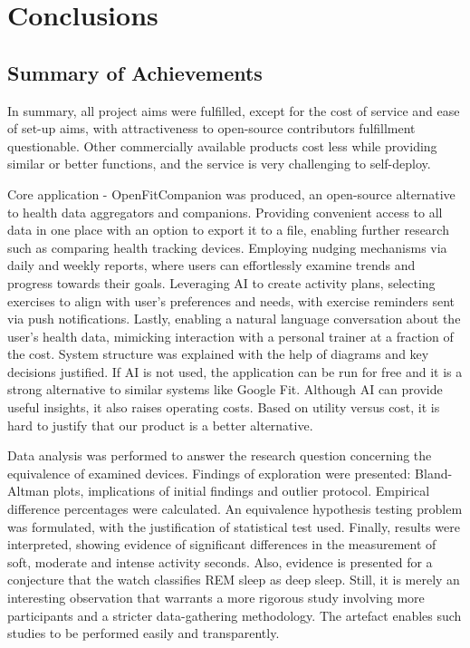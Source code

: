 \chapter{Conclusions}
\label{cha:evaluation}
\section{Summary of Achievements}
In summary, all project aims were fulfilled, except for the cost of service and ease of set-up aims, with attractiveness to open-source contributors fulfillment questionable. Other commercially available products cost less while providing similar or better functions, and the service is very challenging to self-deploy.

Core application - OpenFitCompanion was produced, an open-source alternative to health data aggregators and companions. Providing convenient access to all data in one place with an option to export it to a file, enabling further research such as comparing health tracking devices. Employing nudging mechanisms via daily and weekly reports, where users can effortlessly examine trends and progress towards their goals. Leveraging AI to create activity plans, selecting exercises to align with user's preferences and needs, with exercise reminders sent via push notifications. Lastly, enabling a natural language conversation about the user's health data, mimicking interaction with a personal trainer at a fraction of the cost. System structure was explained with the help of diagrams and key decisions justified. If AI is not used, the application can be run for free and it is a strong alternative to similar systems like Google Fit. Although AI can provide useful insights, it also raises operating costs. Based on utility versus cost, it is hard to justify that our product is a better alternative.

Data analysis was performed to answer the research question concerning the equivalence of examined devices. Findings of exploration were presented: Bland-Altman plots, implications of initial findings and outlier protocol. Empirical difference percentages were calculated. An equivalence hypothesis testing problem was formulated, with the justification of statistical test used. Finally, results were interpreted, showing evidence of significant differences in the measurement of soft, moderate and intense activity seconds. Also, evidence is presented for a conjecture that the watch classifies REM sleep as deep sleep. Still, it is merely an interesting observation that warrants a more rigorous study involving more participants and a stricter data-gathering methodology. The artefact enables such studies to be performed easily and transparently.
